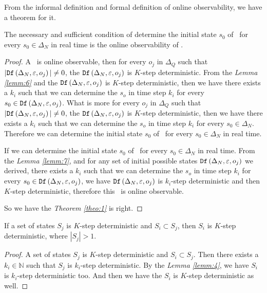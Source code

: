 From the informal definition and formal definition of online observability, we have a theorem for it. 
\begin{theorem}
The necessary and sufficient condition of determine the initial state $s_0$ of \BCNs\ for every $s_0\in \Delta_N$ in real time is the online observability of \BCNs. 
\label{theo:1}
\end{theorem}
\begin{proof}
 A \BCN\ is online observable,
then for every  $o_j$ in $\Delta_Q$ such that $|{\tt Df}\left(\Delta_N,\varepsilon, o_j\right)|\neq 0$, the ${\tt Df}\left(\Delta_N,\varepsilon,o_j\right)$ is $K$-step deterministic. From the {\em Lemma \ref{lemm:6}} and the ${\tt Df}\left(\Delta_N,\varepsilon,o_j\right)$ is $K$-step deterministic, then we have there exists a $k_i$ such that we can determine the $s_o$ in time step $k_i$ for every $s_0\in {\tt Df}\left(\Delta_N,\varepsilon,o_j\right)$.  What is more for every  $o_j$ in $\Delta_Q$ such that $|{\tt Df}\left(\Delta_N,\varepsilon, o_j\right)|\neq 0$, the ${\tt Df}\left(\Delta_N,\varepsilon,o_j\right)$ is $K$-step deterministic, then we have there exists a $k_i$ such that we can determine the $s_o$ in time step $k_i$ for every $s_0\in \Delta_N$. Therefore we can determine the initial state $s_0$ of \BCNs\ for every $s_0\in \Delta_N$ in real time.

If we can determine the initial state $s_0$ of \BCNs\ for every $s_0\in \Delta_N$ in real time. From the {\em Lemma \ref{lemm:7}}, and for any set of initial possible states ${\tt Df}\left(\Delta_N,\varepsilon,o_j\right)$ we derived, there exists a $k_i$ such that we can determine the $s_o$ in time step $k_i$ for every $s_0\in {\tt Df}\left(\Delta_N,\varepsilon,o_j\right)$, we have  ${\tt Df}\left(\Delta_N,\varepsilon,o_j\right)$ is $k_i$-step deterministic and then $K$-step deterministic, therefore this \BCN\ is online observable.

So we have the {\em Theorem \ref{theo:1}} is right.
\end{proof}
\begin{lemma}
 If a set of states $S_j$ is $K$-step deterministic and $S_i\subset S_j$, then $S_i$ is $K$-step deterministic, where $|S_j|>1$.
\label{lemm:3}
\end{lemma}
\begin{proof}A set of states $S_j$ is $K$-step deterministic and $S_i\subset S_j$. Then there exists a $k_i\in \mathbb{N}$ such that $S_j$ is $k_i$-step deterministic. By the {\em Lemma \ref{lemm:4}}, we have $S_i$ is $k_i$-step deterministic too. And then we have the $S_i$ is $K$-step deterministic as well.
\end{proof}

